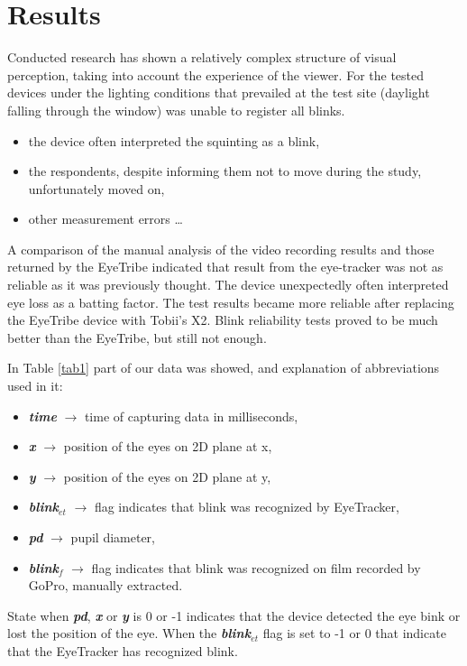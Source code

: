 \documentclass[conference]{IEEEtran}
\newcommand{\RefTab}[1]{Table \ref{#1}}
\begin{document}
\section{Results}
 Conducted research has shown a relatively complex structure of visual perception, taking into account the experience of the viewer. For the tested devices under the lighting conditions that prevailed at the test site (daylight falling through the window) was unable to register all blinks.
\begin{itemize}
	\item the device often interpreted the squinting as a blink,
	\item the respondents, despite informing them not to move during the study, unfortunately moved on,
	\item other measurement errors \ldots
\end{itemize}
A comparison of the manual analysis of the video recording results and those returned by the EyeTribe indicated that result from the eye-tracker was not as reliable as it was previously thought. The device unexpectedly often interpreted eye loss as a batting factor. The test results became more reliable after replacing the EyeTribe device with Tobii's X2. Blink reliability tests proved to be much better than the EyeTribe, but still not enough.
\par
In \RefTab{tab1} part of our data was showed, and explanation of abbreviations used in it:
\begin{itemize}
	\item \textbf{\textit{time}} $\rightarrow$ time of capturing data in milliseconds,
	\item \textbf{\textit{x}} $\rightarrow$ position of the eyes on 2D plane at x,
	\item \textbf{\textit{y}} $\rightarrow$ position of the eyes on 2D plane at y,
	\item \textbf{\textit{blink$_{et}$}} $\rightarrow$ flag indicates that blink was recognized by EyeTracker,
	\item \textbf{\textit{pd}} $\rightarrow$ pupil diameter,
	\item \textbf{\textit{blink$_{f}$}} $\rightarrow$ flag indicates that blink was recognized on film recorded by GoPro, manually extracted.
\end{itemize}
State when \textbf{\textit{pd}}, \textbf{\textit{x}} or \textbf{\textit{y}} is 0 or -1 indicates that the device detected the eye bink or lost the position of the eye. When the \textbf{\textit{blink$_{et}$}} flag is set to -1 or 0 that indicate that the EyeTracker has recognized blink. 
\end{document}
